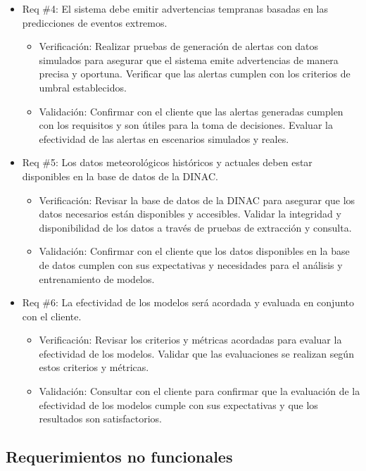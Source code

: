 \documentclass[
11pt, %
codirector, %
]{charter}
\begin{document}
\begin{itemize}
\item Req \#4: El sistema debe emitir advertencias tempranas basadas en las predicciones de eventos extremos.

\begin{itemize}
	\item Verificación: Realizar pruebas de generación de alertas con datos simulados para asegurar que el sistema emite advertencias de manera precisa y oportuna. Verificar que las alertas cumplen con los criterios de umbral establecidos.
	\item Validación: Confirmar con el cliente que las alertas generadas cumplen con los requisitos y son útiles para la toma de decisiones. Evaluar la efectividad de las alertas en escenarios simulados y reales.
\end{itemize}

\item Req \#5: Los datos meteorológicos históricos y actuales deben estar disponibles en la base de datos de la DINAC.

\begin{itemize}
	\item Verificación: Revisar la base de datos de la DINAC para asegurar que los datos necesarios están disponibles y accesibles. Validar la integridad y disponibilidad de los datos a través de pruebas de extracción y consulta.
	\item Validación: Confirmar con el cliente que los datos disponibles en la base de datos cumplen con sus expectativas y necesidades para el análisis y entrenamiento de modelos.
\end{itemize}

\item Req \#6: La efectividad de los modelos será acordada y evaluada en conjunto con el cliente.

\begin{itemize}
	\item Verificación: Revisar los criterios y métricas acordadas para evaluar la efectividad de los modelos. Validar que las evaluaciones se realizan según estos criterios y métricas.
	\item Validación: Consultar con el cliente para confirmar que la evaluación de la efectividad de los modelos cumple con sus expectativas y que los resultados son satisfactorios.
\end{itemize}
\end{itemize}

\subsection{Requerimientos no funcionales}
\end{document}
